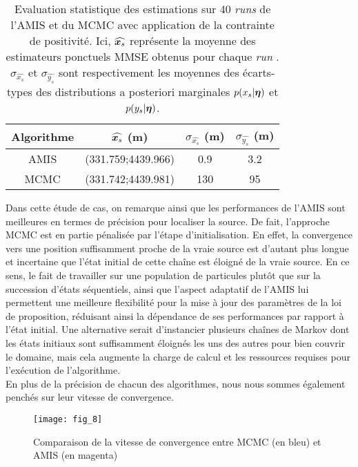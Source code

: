     \begin{table}[h!]
    	\centering
    	
    	\begin{tabular}{cccc}
    		
    		Algorithme & $\widehat{{\bm{x}_s}}$ (m)& $\sigma_{\widehat{x_s}}$ (m)& $\sigma_{\widehat{y_s}}$ (m)\\
    		\hline
    		AMIS                   & (331.759;4439.966)  	& 0.9        & 3.2        \\
    		MCMC                   & (331.742;4439.981)   & 130        & 95 \\      
    		\hline
    	\end{tabular}
    	\caption{Evaluation statistique des estimations sur 40 \textit{runs} de l'AMIS et du MCMC avec application de la contrainte de positivité. Ici, $\widehat{{\bm{x}_s}}$ représente la moyenne des estimateurs ponctuels MMSE obtenus pour chaque \textit{run} . $\sigma_{\widehat{x_s}}$ et $\sigma_{\widehat{y_s}}$ sont respectivement les moyennes des écarts-types des distributions a posteriori marginales $p(x_s | {\bm{\eta}})$ et $p(y_s | {\bm{\eta}})$. }
    	\label{table_2_AE}
    \end{table}
    
 Dans cette étude de cas, on remarque ainsi que les performances de l'AMIS sont meilleures en termes de précision pour localiser la source. De fait, l'approche MCMC est en partie pénalisée par l'étape d'initialisation. En effet, la convergence vers une position suffisamment proche de la vraie source est d'autant plus longue et incertaine que l'état initial de cette chaîne est éloigné de la vraie source. En ce sens, le fait de travailler sur une population de particules plutôt que sur la succession d'états séquentiels, ainsi que l'aspect adaptatif de l'AMIS lui permettent une meilleure flexibilité pour la mise à jour des paramètres de la loi de proposition, réduisant ainsi la dépendance de ses performances par rapport à l'état initial. Une alternative serait d'instancier plusieurs chaînes de Markov dont les états initiaux sont suffisamment éloignés les uns des autres pour bien couvrir le domaine, mais cela augmente la charge de calcul et les ressources requises pour l'exécution de l'algorithme. \\
 
 En plus de la précision de chacun des algorithmes, nous nous sommes également penchés sur leur vitesse de convergence. \\
 
 \begin{figure}[h!]
 	\centering
 	\texttt{[image: fig\_8]}
 	\caption{Comparaison de la vitesse de convergence entre MCMC (en bleu) et AMIS (en magenta)}
 	\label{fig_8_AE} 	
 \end{figure}

